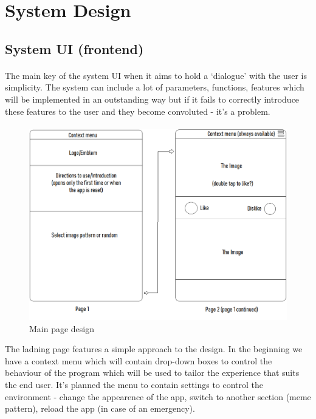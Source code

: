\documentclass[12pt]{report}
\begin{document}
    
    \section*{System Design}

    \subsection*{System UI (frontend)}
    \paragraph{}

    The main key of the system UI when it aims to hold a `dialogue' with the user is simplicity. The system can include a lot of parameters, functions, features which will be implemented in an outstanding way but if it fails to correctly introduce these features to the user and they become convoluted - it's a problem.
    
    \paragraph{}

    \begin{figure}[htbp]
        \centerline{\includegraphics[scale=.5]{img/system_ui.png}}
        \label{system_ui}
        \caption{Main page design}
    \end{figure}

    The ladning page features a simple approach to the design. In the beginning we have a context menu which will contain drop-down boxes to control the behaviour of the program which will be used to tailor the experience that suits the end user. It's planned the menu to contain settings to control the environment - change
    the appearence of the app, switch to another section (meme pattern), reload the app (in case of an emergency). 
\end{document}

